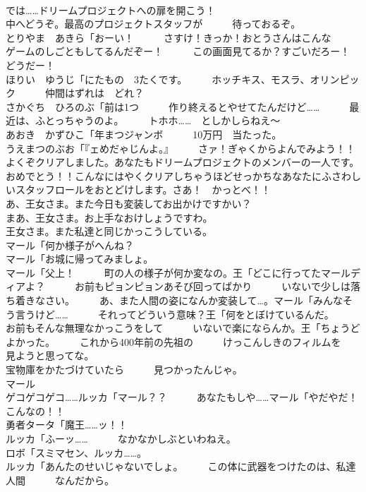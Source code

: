 \documentclass[8pt]{extreport}
\begin{document}
\begin{CJK}{UTF8}{min}
\\	では……ドリームプロジェクトへの扉を開こう！	
\\	中へどうぞ。最高のプロジェクトスタッフが　　　待っておるぞ。	
\\	とりやま　あきら「おーい！　　　さすけ！きっか！おとうさんはこんな　　　ゲームのしごともしてるんだぞー！　　　この画面見てるか？すごいだろー！　　　どうだー！	
\\	ほりい　ゆうじ「にたもの　3たくです。　　　ホッチキス、モスラ、オリンピック　　　仲間はずれは　どれ？	
\\	さかぐち　ひろのぶ「前は1つ　　　作り終えるとやせてたんだけど……　　　最近は、ふとっちゃうのよ。　　　トホホ……　としかしらねえ～	
\\	あおき　かずひこ「年まつジャンボ　　　10万円　当たった。	
\\	うえまつのぶお「『ェめだゃじんよ。』　　　さァ！ぎゃくからよんでみよう！！	
\\	よくぞクリアしました。あなたもドリームプロジェクトのメンバーの一人です。おめでとう！！こんなにはやくクリアしちゃうほどせっかちなあなたにふさわしいスタッフロールをおとどけします。さあ！　かっとべ！！	
\\	あ、王女さま。また今日も変装してお出かけですかい？	
\\	まあ、王女さま。お上手なおけしょうですわ。	
\\	王女さま。また私達と同じかっこうしている。	
\\	マール「何か様子がへんね？	
\\	マール「お城に帰ってみましょ。	
\\	マール「父上！　　　町の人の様子が何か変なの。王「どこに行ってたマールディアよ？　　　お前もピョンピョンあそび回ってばかり　　　いないで少しは落ち着きなさい。　　　あ、また人間の姿になんか変装して…。マール「みんなそう言うけど……　　　それってどういう意味？王「何をとぼけているんだ。　　　お前もそんな無理なかっこうをして　　　いないで楽にならんか。王「ちょうどよかった。　　　これから400年前の先祖の　　　けっこんしきのフィルムを　　　見ようと思ってな。	
\\	宝物庫をかたづけていたら　　　見つかったんじゃ。	
\\	マール
\\	ゲコゲコゲコ……ルッカ「マール？？　　　あなたもしや……マール「やだやだ！　こんなの！！	
\\	勇者タータ「魔王……ッ！！	
\\	ルッカ「ふーッ……　　　なかなかしぶといわねえ。	
\\	ロボ「スミマセン、ルッカ……。	
\\	ルッカ「あんたのせいじゃないでしょ。　　　この体に武器をつけたのは、私達人間　　　なんだから。	

\end{CJK}
\end{document}
